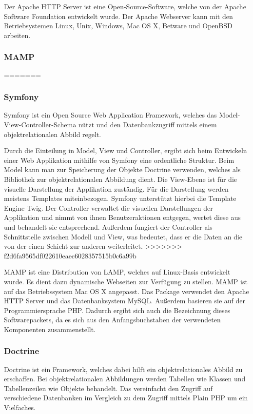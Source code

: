 Der Apache HTTP Server ist eine Open-Source-Software, welche von der Apache Software Foundation entwickelt wurde. Der Apache Webserver kann mit den Betriebsystemen Linux, Unix, Windows, Mac OS X, Betware und OpenBSD arbeiten. 

    \subsubsection{MAMP}
=======
    \subsubsection{Symfony}

Symfony ist ein Open Source Web Application Framework, welches das Model-View-Controller-Schema nützt und den Datenbankzugriff mittels einem objektrelationalen Abbild regelt.

Durch die Einteilung in Model, View und Controller, ergibt sich beim Entwickeln einer Web Applikation mithilfe von Symfony eine ordentliche Struktur.
Beim Model kann man zur Speicherung der Objekte Doctrine verwenden, welches als Bibliothek zur objektrelationalen Abbildung dient.
Die View-Ebene ist für die visuelle Darstellung der Applikation zuständig. Für die  Darstellung werden meistens Templates miteinbezogen. Symfony unterstützt hierbei die Template Engine Twig.
Der Controller verwaltet die visuellen Darstellungen der Applikation und nimmt von ihnen Benutzeraktionen entgegen, wertet diese aus und behandelt sie entsprechend. Außerdem fungiert der Controller als Schnittstelle zwischen Modell und View, was bedeutet, dass er die Daten an die von der einen Schicht zur anderen weiterleitet.
>>>>>>> f2d6fa9565df022610eaec6028357515b0c6a99b

MAMP ist eine Distribution von LAMP, welches auf Linux-Basis entwickelt wurde. Es dient dazu dynamische Webseiten zur Verfügung zu stellen. MAMP ist auf das Betriebssystem Mac OS X angepasst. Das Package verwendet den Apache HTTP Server und das Datenbanksystem MySQL. Außerdem basieren sie auf der Programmiersprache PHP. Dadurch ergibt sich auch die Bezeichnung dieses Softwarepackets, da es sich aus den Anfangsbuchstaben der verwendeten Komponenten zusammenstellt.

    \subsubsection{Doctrine}
    
    Doctrine ist ein Framework, welches dabei hilft ein objektrelationales Abbild zu erschaffen. Bei objektrelationalen Abbildungen werden Tabellen wie Klassen und Tabellenzeilen wie Objekte behandelt. Das vereinfacht den Zugriff auf verschiedene Datenbanken im Vergleich zu dem Zugriff mittels Plain PHP um ein Vielfaches. 
    
